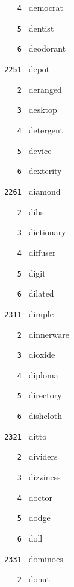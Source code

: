 \documentclass[11pt]{article}
\begin{document}
\begin{multicols}{6}
\noindent \texttt{ \ \ \ 4 } democrat  \par
\noindent \texttt{ \ \ \ 5 } dentist  \par
\noindent \texttt{ \ \ \ 6 } deodorant  \par
\vspace{3mm}
\noindent \texttt{ 2251 } depot  \par
\noindent \texttt{ \ \ \ 2 } deranged  \par
\noindent \texttt{ \ \ \ 3 } desktop  \par
\noindent \texttt{ \ \ \ 4 } detergent  \par
\noindent \texttt{ \ \ \ 5 } device  \par
\noindent \texttt{ \ \ \ 6 } dexterity  \par
\vspace{3mm}
\noindent \texttt{ 2261 } diamond  \par
\noindent \texttt{ \ \ \ 2 } dibs  \par
\noindent \texttt{ \ \ \ 3 } dictionary  \par
\noindent \texttt{ \ \ \ 4 } diffuser  \par
\noindent \texttt{ \ \ \ 5 } digit  \par
\noindent \texttt{ \ \ \ 6 } dilated  \par
\noindent \texttt{ 2311 } dimple  \par
\noindent \texttt{ \ \ \ 2 } dinnerware  \par
\noindent \texttt{ \ \ \ 3 } dioxide  \par
\noindent \texttt{ \ \ \ 4 } diploma  \par
\noindent \texttt{ \ \ \ 5 } directory  \par
\noindent \texttt{ \ \ \ 6 } dishcloth  \par
\vspace{3mm}
\noindent \texttt{ 2321 } ditto  \par
\noindent \texttt{ \ \ \ 2 } dividers  \par
\noindent \texttt{ \ \ \ 3 } dizziness  \par
\noindent \texttt{ \ \ \ 4 } doctor  \par
\noindent \texttt{ \ \ \ 5 } dodge  \par
\noindent \texttt{ \ \ \ 6 } doll  \par
\vspace{3mm}
\noindent \texttt{ 2331 } dominoes  \par
\noindent \texttt{ \ \ \ 2 } donut  \par

\end{multicols}
\end{document}
